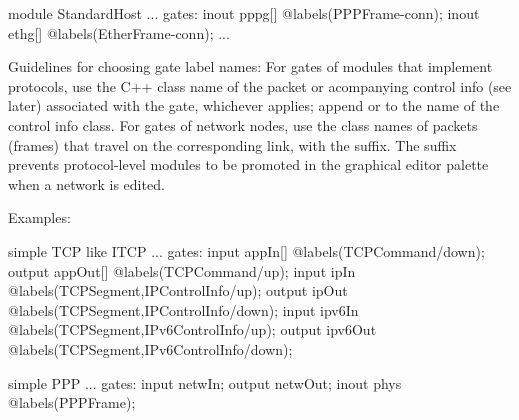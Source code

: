 \begin{ned}
module StandardHost
{
    ...
    gates:
        inout pppg[] @labels(PPPFrame-conn);
        inout ethg[] @labels(EtherFrame-conn);
    ...
}
\end{ned}

Guidelines for choosing gate label names: For gates of modules that
implement protocols, use the C++ class name of the packet or acompanying
control info (see later) associated with the gate, whichever applies;
append  or  to the name of the control info class. For
gates of network nodes, use the class names of packets (frames) that travel
on the corresponding link, with the  suffix. The suffix prevents
protocol-level modules to be promoted in the graphical editor palette when
a network is edited.

Examples:

\begin{ned}
simple TCP like ITCP
{
    ...
    gates:
        input appIn[] @labels(TCPCommand/down);
        output appOut[] @labels(TCPCommand/up);
        input ipIn @labels(TCPSegment,IPControlInfo/up);
        output ipOut @labels(TCPSegment,IPControlInfo/down);
        input ipv6In @labels(TCPSegment,IPv6ControlInfo/up);
        output ipv6Out @labels(TCPSegment,IPv6ControlInfo/down);
}
\end{ned}


\begin{ned}
simple PPP
{
    ...
    gates:
        input netwIn;
        output netwOut;
        inout phys @labels(PPPFrame);
}
\end{ned}




